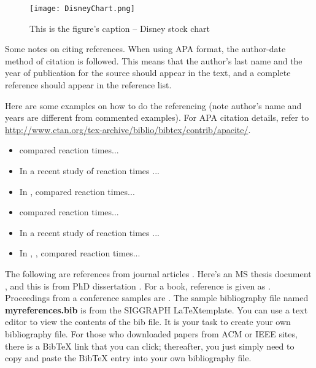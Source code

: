 \begin{figure}[t]                %
   \centering                    %
   \texttt{[image: DisneyChart.png]}      %
   \caption{This is the figure's caption -- Disney stock chart}
    \label{fig:disneystock}
\end{figure}


Some notes on citing references.   When using APA format, the author-date method of citation is 
followed.   This means that the author's last name and the year of publication for the source should 
appear in the text, and a complete reference should appear in the reference list.

%
%

Here are some examples on how to do the referencing (note author's name and years are different
from commented examples).  For APA citation details, refer
to \url{http://www.ctan.org/tex-archive/biblio/bibtex/contrib/apacite/}. 

\begin{itemize}
 \item {} compared reaction times...
 \item In a recent study of reaction times \cite{Bakillah:2014}...
 \item In , \citeauthor{Cao:2015} compared reaction times...
 \item {} compared reaction times... 
 \item In a recent study of reaction times \cite{Darmon:2015}...
 \item In , , compared reaction times...
\end{itemize}

The following are references from journal articles \cite{Lancichinetti:2011}.  Here's an MS thesis document \cite{Lim:2012:0}, and this is from
PhD dissertation \cite{Lim:2012:1}. For a book, reference is given as 
\cite{Papadopoulos:2012}.  Proceedings from a conference samples are \cite{Pearce:2014}.  The sample bibliography file named \textbf{myreferences.bib} is from the
SIGGRAPH \LaTeX template.  You can use a text editor to view the contents of the bib file.  
It is your task to create your own bibliography file.  For those who downloaded papers from
ACM or IEEE sites, there is a BibTeX link that you can click; thereafter, you just simply need
to copy and paste the BibTeX entry into your own bibliography file.



